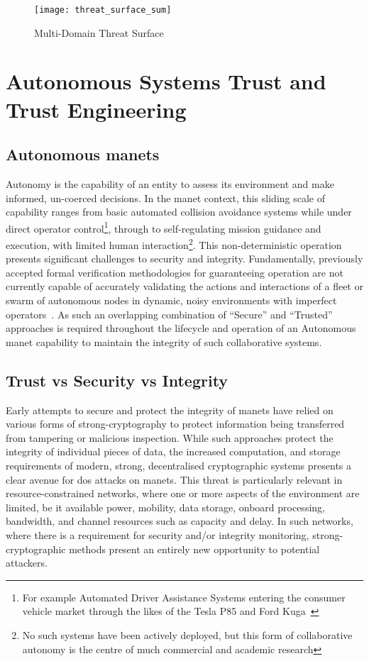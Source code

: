\begin{figure}[h!]
	\centering
	\texttt{[image: threat\_surface\_sum]}
	\caption[Multi-Domain Threat Surface]{Multi-Domain Threat Surface}
	\label{fig:threat_surface}
\end{figure}


\section{Autonomous Systems Trust and Trust Engineering}

\subsection{Autonomous \glspl{manet}}
Autonomy is the capability of an entity to assess its environment and make informed, un-coerced decisions.
In the \gls{manet} context, this sliding scale of capability ranges from basic automated collision avoidance systems while under direct operator control\footnote{For example Automated Driver Assistance Systems entering the consumer vehicle market through the likes of the Tesla P85 and Ford Kuga~\cite{Sawade2016}}, through to self-regulating mission guidance and execution, with limited human interaction\footnote{No such systems have been actively deployed, but this form of collaborative autonomy is the centre of much commercial and academic research\cite{Rajesh2015,Autefage2015,Teke2015}}.
This non-deterministic operation presents significant challenges to security and integrity.
Fundamentally, previously accepted formal verification methodologies for guaranteeing operation are not currently capable of accurately validating the actions and interactions of a fleet or swarm of autonomous nodes in dynamic, noisy environments with imperfect operators~\cite{Teke2015}. 
As such an overlapping combination of ``Secure'' and ``Trusted'' approaches is required throughout the lifecycle and operation of an Autonomous \gls{manet} capability to maintain the integrity of such collaborative systems.

\subsection{Trust vs Security vs Integrity}

Early attempts to secure and protect the integrity of \glspl{manet} have relied on various forms of strong-cryptography to protect information being transferred from tampering or malicious inspection.
While such approaches protect the integrity of individual pieces of data, the increased computation, and storage requirements of modern, strong, decentralised cryptographic systems presents a clear avenue for \gls{dos} attacks on \glspl{manet}.
This threat is particularly relevant in resource-constrained networks, where one or more aspects of the environment are limited, be it available power, mobility, data storage, onboard processing, bandwidth, and channel resources such as capacity and delay.
In such networks, where there is a requirement for security and/or integrity monitoring, strong-cryptographic methods present an entirely new opportunity to potential attackers.

